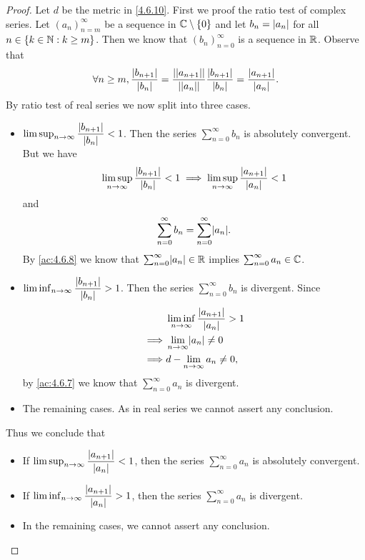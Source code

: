 \begin{proof}
  Let \(d\) be the metric in \cref{4.6.10}.
  First we proof the ratio test of complex series.
  Let \((a_n)_{n = m}^\infty\) be a sequence in \(\mathbb{C} \setminus \{0\}\) and let \(b_n = \left\lvert a_n\right\rvert\) for all \(n \in \{k \in \mathbb{N} : k \geq m\}\).
  Then we know that \((b_n)_{n = 0}^\infty\) is a sequence in \(\mathbb{R}\).
  Observe that
  \[
    \forall n \geq m, \dfrac{\left\lvert b_{n + 1}\right\rvert}{\left\lvert b_n\right\rvert} = \dfrac{\left\lvert\left\lvert a_{n + 1}\right\rvert\right\rvert}{\left\lvert\left\lvert a_n\right\rvert\right\rvert} \dfrac{\left\lvert b_{n + 1}\right\rvert}{\left\lvert b_n\right\rvert} = \dfrac{\left\lvert a_{n + 1}\right\rvert}{\left\lvert a_n\right\rvert}.
  \]
  By ratio test of real series we now split into three cases.
  \begin{itemize}
    \item \(\limsup_{n \to \infty} \dfrac{\left\lvert b_{n + 1}\right\rvert}{\left\lvert b_n\right\rvert} < 1\).
          Then the series \(\sum_{n = 0}^\infty b_n\) is absolutely convergent.
          But we have
          \[
            \limsup_{n \to \infty} \dfrac{\left\lvert b_{n + 1}\right\rvert}{\left\lvert b_n\right\rvert} < 1 \implies \limsup_{n \to \infty} \dfrac{\left\lvert a_{n + 1}\right\rvert}{\left\lvert a_n\right\rvert} < 1
          \]
          and
          \[
            \sum_{n = 0}^\infty b_n = \sum_{n = 0}^\infty \abs{a_n}.
          \]
          By \cref{ac:4.6.8} we know that \(\sum_{n = 0}^\infty \abs{a_n} \in \R\) implies \(\sum_{n = 0}^\infty a_n \in \mathbb{C}\).
    \item \(\liminf_{n \to \infty} \dfrac{\left\lvert b_{n + 1}\right\rvert}{\left\lvert b_n\right\rvert} > 1\).
          Then the series \(\sum_{n = 0}^\infty b_n\) is divergent.
          Since
          \begin{align*}
                     & \liminf_{n \to \infty} \dfrac{\abs{a_{n + 1}}}{\abs{a_n}} > 1 \\
            \implies & \lim_{n \to \infty} \abs{a_n} \neq 0                          \\
            \implies & d - \lim_{n \to \infty} a_n \neq 0,
          \end{align*}
          by \cref{ac:4.6.7} we know that \(\sum_{n = 0}^\infty a_n\) is divergent.
    \item The remaining cases.
          As in real series we cannot assert any conclusion.
  \end{itemize}
  Thus we conclude that
  \begin{itemize}
    \item If \(\limsup_{n \to \infty} \dfrac{\left\lvert a_{n + 1}\right\rvert}{\left\lvert a_n\right\rvert} < 1\), then the series \(\sum_{n = 0}^\infty a_n\) is absolutely convergent.
    \item If \(\liminf_{n \to \infty} \dfrac{\left\lvert a_{n + 1}\right\rvert}{\left\lvert a_n\right\rvert} > 1\), then the series \(\sum_{n = 0}^\infty a_n\) is divergent.
    \item In the remaining cases, we cannot assert any conclusion.
  \end{itemize}


\end{proof}
